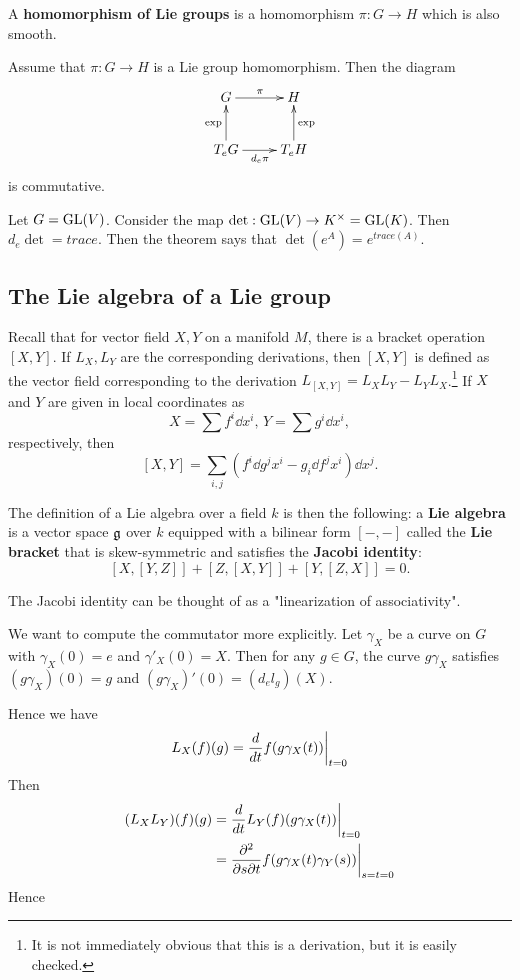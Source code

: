 \documentclass[11pt, english]{article}
\begin{document}
A \textbf{homomorphism of Lie groups} is a homomorphism $\pi:G \to H$ which is also smooth.

\begin{thm}
 Assume that $\pi:G \to H$ is a Lie group homomorphism. Then the diagram
$$
\xymatrix{
G \ar[r]^\pi & H \\
T_eG \ar[u]^{\exp} \ar[r]_{d_e\pi} & T_e H \ar[u]_\exp
}
$$
is commutative.
\end{thm}

\begin{example}
  Let $G = \operatorname{GL}(V)$. Consider the map $\det:\operatorname{GL}(V) \to K^\times = \operatorname{GL}(K)$. Then $d_e \det = trace$. Then the theorem says that $\det(e^A)=e^{trace(A)}$.
\end{example}

\subsection{The Lie algebra of a Lie group}

Recall that for vector field $X,Y$ on a manifold $M$, there is a bracket operation $[X,Y]$. If $L_X,L_Y$ are the corresponding derivations, then $[X,Y]$ is defined as the vector field corresponding to the derivation $L_{[X,Y]} = L_X L_Y - L_Y L_X$.\footnote{It is not immediately obvious that this is a derivation, but it is easily checked.} If $X$ and $Y$ are given in local coordinates as 
$$
X = \sum f^i \dd{}{x^i}, \, Y = \sum g^i \dd{}{x^i},
$$
respectively, then
$$
[X,Y] = \sum_{i,j} \left(f^i \dd{g^j}{x^i} - g_i \dd{f^j}{x^i} \right) \dd{}{x^j}.
$$

The definition of a Lie algebra over a field $k$ is then the following: a \textbf{Lie algebra} is a vector space $\mathfrak g$ over $k$ equipped with a bilinear form $[-,-]$ called the \textbf{Lie bracket} that is skew-symmetric and satisfies the \textbf{Jacobi identity}:
$$
[X,[Y,Z]] + [Z,[X,Y]] + [Y,[Z,X]] = 0.
$$

The Jacobi identity can be thought of as a "linearization of associativity". 

We want to compute the commutator more explicitly. Let $\gamma_X$ be a curve on $G$ with $\gamma_X(0)=e$ and $\gamma'_X(0)=X$. Then for any $g \in G$, the curve $g \gamma_X$ satisfies $(g \gamma_X)(0)=g$ and $(g \gamma_X)'(0) = (d_e l_g)(X)$. 

Hence we have 
$$
L_X(f)(g) =\restr{ \frac{d}{dt} f(g \gamma_X(t))}{t=0}
$$
Then
\begin{align*}
(L_XL_Y)(f)(g) &= \restr{\frac{d}{dt} L_Y(f) (g \gamma_X(t))}{t=0} \\
&= \restr{\frac{\partial^2}{\partial s \partial t} f(g \gamma_X(t) \gamma_Y(s))}{s=t=0}
\end{align*}
Hence
\end{document}
